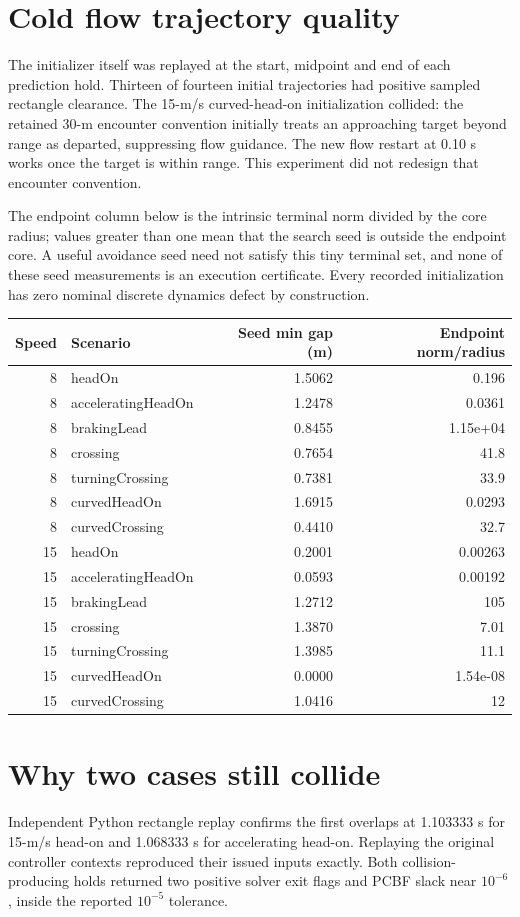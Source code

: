 \documentclass[10pt]{article}
\begin{document}
\section{Cold flow trajectory quality}
The initializer itself was replayed at the start, midpoint and end of each prediction hold. Thirteen of fourteen initial trajectories had positive sampled rectangle clearance. The 15-m/s curved-head-on initialization collided: the retained 30-m encounter convention initially treats an approaching target beyond range as departed, suppressing flow guidance. The new flow restart at 0.10 s works once the target is within range. This experiment did not redesign that encounter convention.

The endpoint column below is the intrinsic terminal norm divided by the core radius; values greater than one mean that the search seed is outside the endpoint core. A useful avoidance seed need not satisfy this tiny terminal set, and none of these seed measurements is an execution certificate. Every recorded initialization has zero nominal discrete dynamics defect by construction.
\begin{longtable}{rlrr}
\toprule Speed & Scenario & Seed min gap (m) & Endpoint norm/radius \\
\midrule\endhead
8 & headOn & 1.5062 & 0.196 \\
8 & acceleratingHeadOn & 1.2478 & 0.0361 \\
8 & brakingLead & 0.8455 & 1.15e+04 \\
8 & crossing & 0.7654 & 41.8 \\
8 & turningCrossing & 0.7381 & 33.9 \\
8 & curvedHeadOn & 1.6915 & 0.0293 \\
8 & curvedCrossing & 0.4410 & 32.7 \\
15 & headOn & 0.2001 & 0.00263 \\
15 & acceleratingHeadOn & 0.0593 & 0.00192 \\
15 & brakingLead & 1.2712 & 105 \\
15 & crossing & 1.3870 & 7.01 \\
15 & turningCrossing & 1.3985 & 11.1 \\
15 & curvedHeadOn & 0.0000 & 1.54e-08 \\
15 & curvedCrossing & 1.0416 & 12 \\
\bottomrule\end{longtable}
\section{Why two cases still collide}
Independent Python rectangle replay confirms the first overlaps at 1.103333 s for 15-m/s head-on and 1.068333 s for accelerating head-on. Replaying the original controller contexts reproduced their issued inputs exactly. Both collision-producing holds returned two positive solver exit flags and PCBF slack near $10^{-6}$, inside the reported $10^{-5}$ tolerance.
\end{document}
